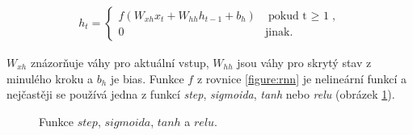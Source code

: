 \begin{align}\label{figure:rnn}
  h_t = \begin{cases}
          f(W_{xh}x_t + W_{hh}h_{t-1} + b_h) & \mbox{pokud t $\geq$ 1}, \\
          0 & \mbox{jinak}.
        \end{cases}
\end{align}


$W_{xh}$ znázorňuje váhy pro aktuální vstup, $W_{hh}$ jsou váhy pro skrytý stav z minulého kroku a $b_h$ je bias. Funkce $f$ z rovnice \ref{figure:rnn} je nelineární funkcí a nejčastěji se používá jedna z funkcí \emph{step}, \emph{sigmoida}, \emph{tanh} nebo \emph{relu} (obrázek \ref{img:functions}).

\begin{figure}[H]
    \begin{center}
    \end{center}
	\caption{Funkce $step$, $sigmoida$, $tanh$ a $relu$.}
	\label{img:functions}
\end{figure}

